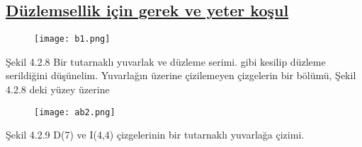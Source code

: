 \documentclass{article}
\begin{document}
\subsection{ \underline{Düzlemsellik için gerek ve yeter koşul} }
\begin{figure}[h]
    \texttt{[image: b1.png]}
    \label{Sekil 4.2.8}  
\end{figure}

Şekil 4.2.8 Bir tutarnaklı yuvarlak ve düzleme serimi. gibi kesilip düzleme serildiğini düşünelim.
Yuvarlağın üzerine çizilemeyen çizgelerin bir
bölümü, Şekil 4.2.8 deki yüzey üzerine

\begin{figure}[h]   
    \texttt{[image: ab2.png]}
    \label{Sekil 4.2.9}
\end{figure}
Şekil 4.2.9 D(7) ve I(4,4) çizgelerinin bir
tutarnaklı yuvarlağa çizimi. 
\end{document}
